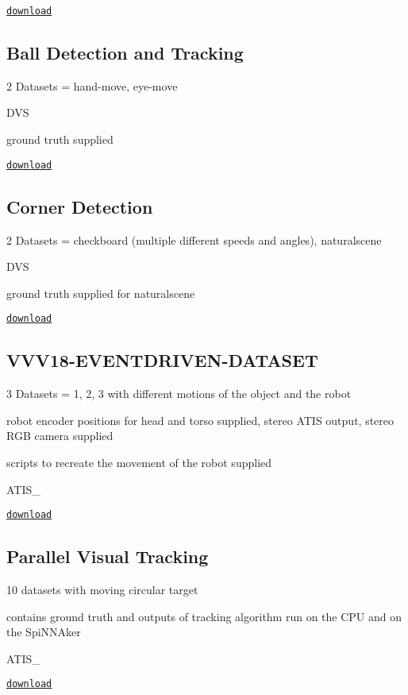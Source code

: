 \href{https://doi.org/10.5281/zenodo.2556755}{\tt download}

\subsection*{Ball Detection and Tracking}


\begin{DoxyItemize}
\item 2 Datasets = hand-\/move, eye-\/move
\item D\+VS
\item ground truth supplied
\end{DoxyItemize}

\href{https://figshare.com/s/0abd8f18312bec15b121}{\tt download}

\subsection*{Corner Detection}


\begin{DoxyItemize}
\item 2 Datasets = checkboard (multiple different speeds and angles), naturalscene
\item D\+VS
\item ground truth supplied for naturalscene
\end{DoxyItemize}

\href{https://figshare.com/s/0abd8f18312bec15b121}{\tt download}

\subsection*{V\+V\+V18-\/\+E\+V\+E\+N\+T\+D\+R\+I\+V\+E\+N-\/\+D\+A\+T\+A\+S\+ET}


\begin{DoxyItemize}
\item 3 Datasets = 1, 2, 3 with different motions of the object and the robot
\item robot encoder positions for head and torso supplied, stereo A\+T\+IS output, stereo R\+GB camera supplied
\item scripts to recreate the movement of the robot supplied
\item A\+T\+I\+S\+\_
\end{DoxyItemize}

\href{https://figshare.com/s/0abd8f18312bec15b121}{\tt download}

\subsection*{Parallel Visual Tracking}


\begin{DoxyItemize}
\item 10 datasets with moving circular target
\item contains ground truth and outputs of tracking algorithm run on the C\+PU and on the Spi\+N\+N\+Aker
\item A\+T\+I\+S\+\_
\end{DoxyItemize}

\href{https://doi.org/10.5281/zenodo.2556755}{\tt download} 